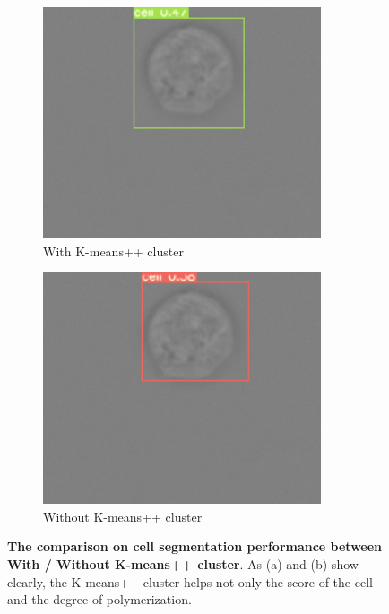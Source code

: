 \begin{figure}[h]
\begin{center}
		\begin{subfigure}[b]{0.49\textwidth}
		    \centering
			\includegraphics[width=0.9\textwidth]{thesis-template-master/images/withkmean1.png}
			\caption{With K-means++ cluster}
			\label{fig:cellnet}
		\end{subfigure}
		\begin{subfigure}[b]{0.49\textwidth}
		    \centering
			\includegraphics[width=0.9\textwidth]{thesis-template-master/images/withoutkmean2.png}
			\caption{Without K-means++ cluster}
			\label{fig:cellnet}
		\end{subfigure}
	\end{center}
	\caption{\textbf{The comparison on cell segmentation  performance between With / Without K-means++ cluster}. As (a) and (b) show clearly, the K-means++ cluster helps not only the score of the cell  and the degree of polymerization. }
	\label{fig:3.3}
\end{figure}


